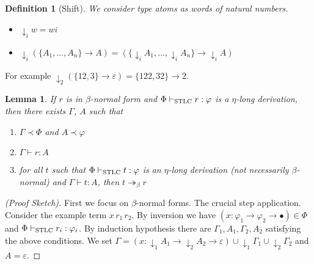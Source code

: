 \documentclass[10pt,a4paper]{article}
\theoremstyle{plain}%
\newtheorem{definition}[theorem]{Definition}
\newtheorem{lemma}[theorem]{Lemma}
\begin{document}
\begin{definition}[Shift]
We consider type atoms as words of natural numbers.
\begin{itemize}
\item ${\downarrow_i}w = wi$
\item ${\downarrow_i}(\{A_1, \ldots, A_n\} \to A) = (\{{\downarrow_i}A_1, \ldots, {\downarrow_i}A_n\} \to {\downarrow_i}A)$
\end{itemize}
\end{definition}

For example ${\downarrow_2}(\{12, 3\} \to \varepsilon) = \{122, 32\} \to 2$.

\begin{lemma}
If $r$ is in $\beta$-normal form and $\Phi \vdash_{\textnormal{STLC}} r : \varphi$ is a $\eta$-long derivation, then there exists $\Gamma$, $A$ such that
\begin{enumerate}
\item $\Gamma \prec \Phi$ and $A \prec \varphi$
\item $\Gamma \vdash r : A$
\item for all $t$ such that $\Phi \vdash_{\textnormal{STLC}} t : \varphi$ is an $\eta$-long derivation (not necessarily $\beta$-normal) and $\Gamma \vdash t : A$, then $t \twoheadrightarrow_\beta r$
\end{enumerate}
\end{lemma}

\begin{proof}[(Proof Sketch)]
First we focus on $\beta$-normal forms.
The crucial step application.
Consider the example term $x\,r_1\,r_2$. By inversion we have $(x : \varphi_1 \to \varphi_2 \to \bullet) \in \Phi$ and $\Phi \vdash_{\textnormal{STLC}} r_i : \varphi_i$.
By induction hypothesis there are $\Gamma_1, A_1, \Gamma_2, A_2$ satisfying the above conditions.
We set $\Gamma = (x : {\downarrow_1} A_1 \to {\downarrow_2} A_2 \to \varepsilon) \cup {\downarrow_1}\Gamma_1 \cup {\downarrow_2}\Gamma_2$
and $A = \varepsilon$.
\end{proof}

\newpage

\printbibliography
\end{document}
